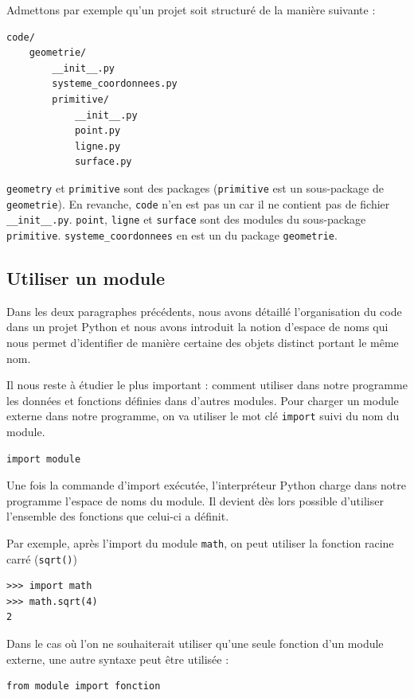 \documentclass[12pt, a4paper]{article}
\begin{document}
Admettons par exemple qu'un projet soit structuré de la manière suivante :
\begin{lstlisting}
code/
    geometrie/
        __init__.py
        systeme_coordonnees.py
        primitive/
            __init__.py
            point.py
            ligne.py
            surface.py
\end{lstlisting}

\lstinline{geometry} et \lstinline{primitive} sont des packages (\lstinline{primitive} est un sous-package de \lstinline{geometrie}). En revanche, \lstinline{code} n'en est pas un car il ne contient pas de fichier \lstinline{__init__.py}. \lstinline{point}, \lstinline{ligne} et \lstinline{surface} sont des modules du sous-package \lstinline{primitive}. \lstinline{systeme_coordonnees} en est un du package \lstinline{geometrie}.


\subsection{Utiliser un module}
Dans les deux paragraphes précédents, nous avons détaillé l'organisation du code dans un projet Python et nous avons introduit la notion d'espace de noms qui nous permet d'identifier de manière certaine des objets distinct portant le même nom.

Il nous reste à étudier le plus important : comment utiliser dans notre programme les données et fonctions définies dans d'autres modules. Pour charger un module externe dans notre programme, on va utiliser le mot clé \lstinline{import} suivi du nom du module.
\begin{lstlisting}
import module
\end{lstlisting}

Une fois la commande d'import exécutée, l'interpréteur Python charge dans notre programme l'espace de noms du module. Il devient dès lors possible d'utiliser l'ensemble des fonctions que celui-ci a définit.

Par exemple, après l'import du module \lstinline{math}, on peut utiliser la fonction racine carré (\lstinline{sqrt()})
\begin{lstlisting}
>>> import math
>>> math.sqrt(4)
2
\end{lstlisting}

Dans le cas où l'on ne souhaiterait utiliser qu'une seule fonction d'un module externe, une autre syntaxe peut être utilisée :
\begin{lstlisting}
from module import fonction
\end{lstlisting}
\end{document}
